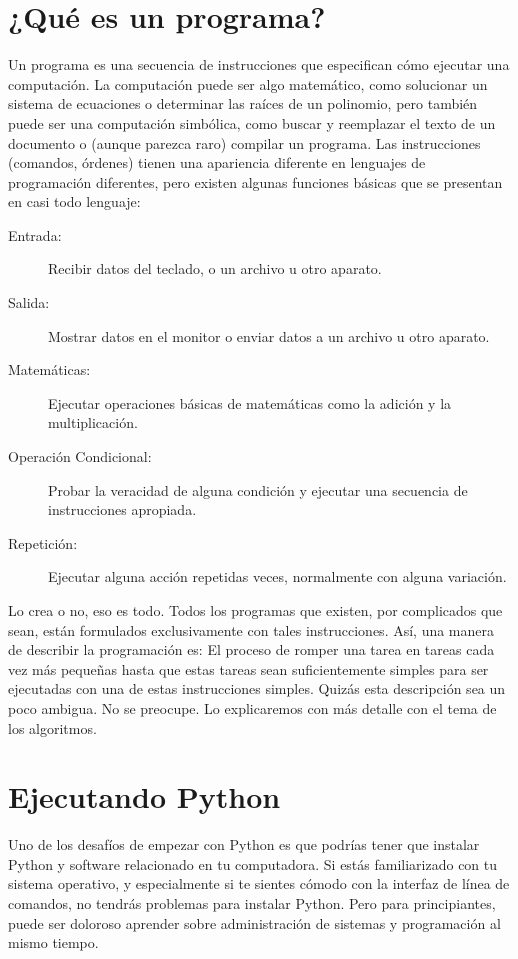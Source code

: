 \documentclass[12pt,letterpaper]{book}
\begin{document}
\section{¿Qué es un programa?}
Un programa es una secuencia de instrucciones que especifican cómo ejecutar
una computación. La computación puede ser algo matemático, como solucionar
un sistema de ecuaciones o determinar las raíces de un polinomio, pero también
puede ser una computación simbólica, como buscar y reemplazar el texto de un
documento o (aunque parezca raro) compilar un programa.
Las instrucciones (comandos, órdenes) tienen una apariencia diferente en lenguajes de programación diferentes, pero existen algunas funciones básicas que
se presentan en casi todo lenguaje:
\begin{description}
    \item[Entrada: ] Recibir datos del teclado, o un archivo u otro aparato.
    \item[Salida:] Mostrar datos en el monitor o enviar datos a un archivo u otro aparato.
    \item[Matemáticas:] Ejecutar operaciones básicas de matemáticas como la adición y la multiplicación.
    \item[Operación Condicional:] Probar la veracidad de alguna condición y ejecutar una secuencia de instrucciones apropiada.
    \item[Repetición:] Ejecutar alguna acción repetidas veces, normalmente con alguna variación.
\end{description}
Lo crea o no, eso es todo. Todos los programas que existen, por complicados que
sean, están formulados exclusivamente con tales instrucciones. Así, una manera
de describir la programación es: El proceso de romper una tarea en tareas cada
vez más pequeñas hasta que estas tareas sean suficientemente simples para ser
ejecutadas con una de estas instrucciones simples.
Quizás esta descripción sea un poco ambigua. No se preocupe. Lo explicaremos
con más detalle con el tema de los algoritmos.

\section{Ejecutando Python}
Uno de los desafíos de empezar con Python es que podrías tener que instalar Python y software relacionado en tu computadora. Si estás familiarizado con tu sistema operativo, y especialmente si te sientes cómodo con la interfaz de línea de comandos, no tendrás problemas para instalar Python. Pero para principiantes, puede ser doloroso aprender sobre administración de sistemas y programación al mismo tiempo.
\end{document}
